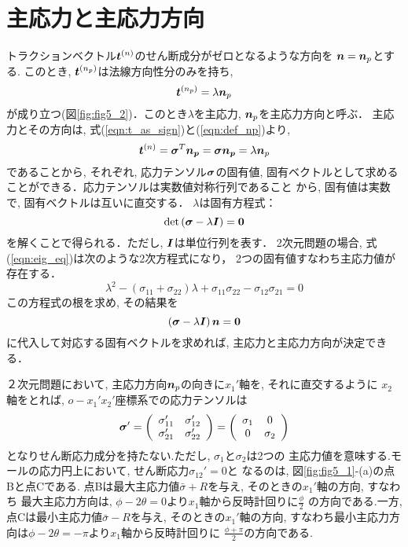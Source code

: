 \documentclass[10pt,a4j]{jbook}
\begin{document}
\section{主応力と主応力方向}
トラクションベクトル$\mbox{\boldmath $t$}^{(n)}$のせん断成分がゼロとなるような方向を
$\mbox{\boldmath $n$}=\mbox{\boldmath $n$}_p$とする. このとき, $\mbox{\boldmath $t$}^{(n_p)}$は法線方向性分のみを持ち, 
\begin{equation}
	\mbox{\boldmath $t$}^{(n_p)}=\lambda \mbox{\boldmath $n$}_p
	\label{eqn:def_np}
\end{equation}
が成り立つ(図\ref{fig:fig5_2})．このとき$\lambda$を主応力, $\mbox{\boldmath $n$}_p$を主応力方向と呼ぶ．
主応力とその方向は, 式(\ref{eqn:t_as_sign})と(\ref{eqn:def_np})より, 
\begin{equation}
	\mbox{\boldmath $t$}^{(n)}
	=\mbox{\boldmath $\sigma$}^T \mbox{\boldmath $n_p$} 
	=\mbox{\boldmath $\sigma$}\mbox{\boldmath $n_p$} 
	=\lambda \mbox{\boldmath $n$}_p
\end{equation}
であることから, それぞれ, 応力テンソル$\mbox{\boldmath $\sigma$}$の固有値, 
固有ベクトルとして求めることができる．応力テンソルは実数値対称行列であること
から, 固有値は実数で, 固有ベクトルは互いに直交する．
$\lambda$は固有方程式：
\begin{equation}
	{\rm det} \left( \mbox{\boldmath $\sigma$}- \lambda \mbox{\boldmath $I$} \right) =\mbox{\boldmath $0$} 
	\label{eqn:eig_eq}
\end{equation}
を解くことで得られる．ただし, $\mbox{\boldmath $I$}$は単位行列を表す．
2次元問題の場合, 式(\ref{eqn:eig_eq})は次のような2次方程式になり，
2つの固有値すなわち主応力値が存在する．
\begin{equation}
	\lambda^2 -\left( \sigma_{11}+\sigma_{22}\right)\lambda + 
	\sigma_{11}\sigma_{22}-\sigma_{12}\sigma_{21}=0
	\label{eqn:eig_eq_2d}
\end{equation}
この方程式の根を求め, その結果を
\begin{equation}
	\left( \mbox{\boldmath $\sigma$} -\lambda \mbox{\boldmath $I$} \right) \mbox{\boldmath $n$}=\mbox{\boldmath $0$}
\end{equation}
に代入して対応する固有ベクトルを求めれば, 主応力と主応力方向が決定できる．

２次元問題において, 主応力方向$\mbox{\boldmath $n$}_p$の向きに$x_1'$軸を, それに直交するように
$x_2$軸をとれば, $o-x_1'x_2'$座標系での応力テンソルは
\begin{equation}
	\mbox{\boldmath $\sigma$}'
	=
	\left(
	\begin{array}{cc}
		\sigma_{11}' & \sigma_{12}' \\
		\sigma_{21}' & \sigma_{22}' 
	\end{array}
	\right)
	=
	\left(
	\begin{array}{cc}
		\sigma_1 & 0 \\
		0 & \sigma_2
	\end{array}
	\right)
\end{equation}
となりせん断応力成分を持たない.ただし, $\sigma_1$と$\sigma_2$は2つの
主応力値を意味する.モールの応力円上において, せん断応力$\sigma_{12}'=0$と
なるのは, 図\ref{fig:fig5_1}-(a)の点Bと点Cである.
点Bは最大主応力値$\bar{\sigma}+R$を与え, そのときの$x_1'$軸の方向, すなわち
最大主応力方向は, $\phi -2 \theta =0 $より$x_1$軸から反時計回りに$\frac{\phi}{2}$
の方向である.一方, 点Cは最小主応力値$\bar{\sigma}-R$を与え, そのときの$x_1'$軸の方向, 
すなわち最小主応力方向は$\phi -2 \theta =- \pi $より$x_1$軸から反時計回りに
$\frac{\phi+\pi}{2}$の方向である.
\newpage
\end{document}
